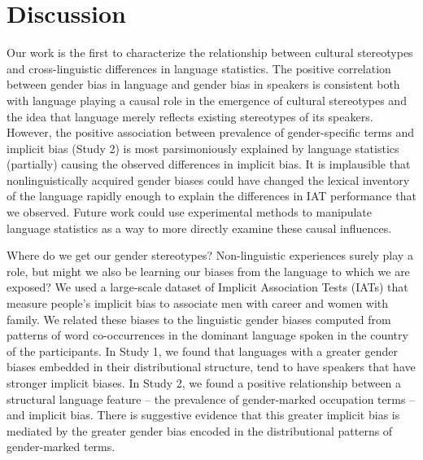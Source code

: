 \documentclass[9pt,twocolumn,twoside,lineno]{pnas-new}
\begin{document}
\section*{Discussion}\label{general-discussion}

Our work is the first to characterize the relationship between cultural stereotypes and cross-linguistic differences in language statistics. The positive correlation between gender bias in language and gender bias in speakers is consistent both with language playing a causal role in the emergence of cultural stereotypes and the idea that language merely reflects existing stereotypes of its speakers. However, the positive association between prevalence of gender-specific terms and implicit bias (Study 2) is most parsimoniously explained by language statistics (partially) causing the observed differences in implicit bias. It is implausible that nonlinguistically acquired gender biases could have changed the lexical inventory of the language rapidly enough to explain the differences in IAT performance that we observed. Future work could use experimental methods to manipulate language statistics as a way to more directly examine these causal influences.

Where do we get our gender stereotypes? Non-linguistic experiences surely play a role, but might we also be learning our biases from the language to which we are exposed? We used a large-scale dataset of Implicit Association Tests (IATs) that measure people's implicit bias to associate men with career and women with family. We related these biases to the linguistic gender biases computed from patterns of word co-occurrences in the dominant language spoken in the country of the participants. In Study 1, we found that languages with a greater gender biases embedded in their distributional structure, tend to have speakers that have stronger implicit biases. In Study 2, we found a positive relationship between a structural language feature – the prevalence of gender-marked occupation terms – and implicit bias. There is suggestive evidence that this greater implicit bias is mediated by the greater gender bias encoded in the distributional patterns of gender-marked terms.
\end{document}
